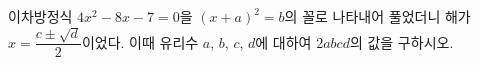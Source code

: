 이차방정식 $4x^2-8x-7=0$을 $(x+a)^2=b$의 꼴로 나타내어 풀었더니 해가 $x=\dfrac{c\pm\sqrt{d}}{2}$이었다. 이때 유리수 $a$, $b$, $c$, $d$에 대하여 $2abcd$의 값을 구하시오.
